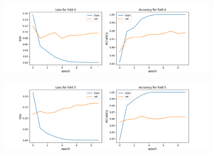 \begin{appendices}
\begin{figure}[hbtp]
\centering
\includegraphics[scale=0.5]{../Images/res50_fold_4_plot.png}
\end{figure}
\begin{figure}[hbtp]

\centering
\includegraphics[scale=0.5]{../Images/res50_fold_5_plot.png}
\end{figure}

\end{appendices}